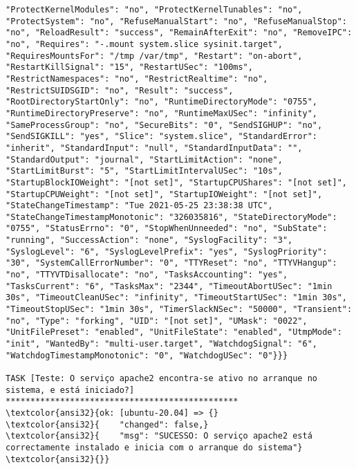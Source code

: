 \documentclass{scrartcl}
\begin{document}
\begin{Verbatim}
"ProtectKernelModules": "no", "ProtectKernelTunables": "no", "ProtectSystem": "no", "RefuseManualStart": "no", "RefuseManualStop": "no", "ReloadResult": "success", "RemainAfterExit": "no", "RemoveIPC": "no", "Requires": "-.mount system.slice sysinit.target", "RequiresMountsFor": "/tmp /var/tmp", "Restart": "on-abort", "RestartKillSignal": "15", "RestartUSec": "100ms", "RestrictNamespaces": "no", "RestrictRealtime": "no", "RestrictSUIDSGID": "no", "Result": "success", "RootDirectoryStartOnly": "no", "RuntimeDirectoryMode": "0755", "RuntimeDirectoryPreserve": "no", "RuntimeMaxUSec": "infinity", "SameProcessGroup": "no", "SecureBits": "0", "SendSIGHUP": "no", "SendSIGKILL": "yes", "Slice": "system.slice", "StandardError": "inherit", "StandardInput": "null", "StandardInputData": "", "StandardOutput": "journal", "StartLimitAction": "none", "StartLimitBurst": "5", "StartLimitIntervalUSec": "10s", "StartupBlockIOWeight": "[not set]", "StartupCPUShares": "[not set]", "StartupCPUWeight": "[not set]", "StartupIOWeight": "[not set]", "StateChangeTimestamp": "Tue 2021-05-25 23:38:38 UTC", "StateChangeTimestampMonotonic": "326035816", "StateDirectoryMode": "0755", "StatusErrno": "0", "StopWhenUnneeded": "no", "SubState": "running", "SuccessAction": "none", "SyslogFacility": "3", "SyslogLevel": "6", "SyslogLevelPrefix": "yes", "SyslogPriority": "30", "SystemCallErrorNumber": "0", "TTYReset": "no", "TTYVHangup": "no", "TTYVTDisallocate": "no", "TasksAccounting": "yes", "TasksCurrent": "6", "TasksMax": "2344", "TimeoutAbortUSec": "1min 30s", "TimeoutCleanUSec": "infinity", "TimeoutStartUSec": "1min 30s", "TimeoutStopUSec": "1min 30s", "TimerSlackNSec": "50000", "Transient": "no", "Type": "forking", "UID": "[not set]", "UMask": "0022", "UnitFilePreset": "enabled", "UnitFileState": "enabled", "UtmpMode": "init", "WantedBy": "multi-user.target", "WatchdogSignal": "6", "WatchdogTimestampMonotonic": "0", "WatchdogUSec": "0"}}}

TASK [Teste: O serviço apache2 encontra-se ativo no arranque no sistema, e está iniciado?] ***********************************************
\textcolor{ansi32}{ok: [ubuntu-20.04] => {}
\textcolor{ansi32}{    "changed": false,}
\textcolor{ansi32}{    "msg": "SUCESSO: O serviço apache2 está correctamente instalado e inicia com o arranque do sistema"}
\textcolor{ansi32}{}}


\end{Verbatim}
\end{document}
